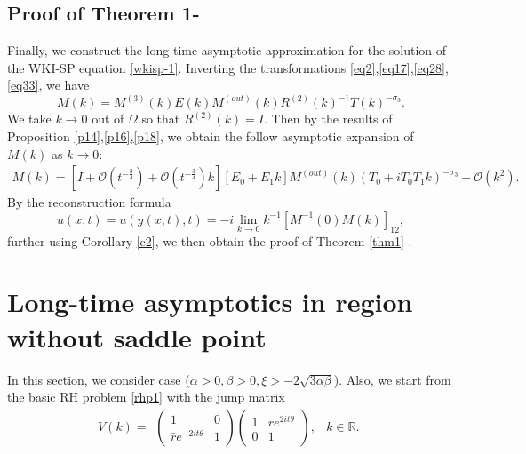 \documentclass[11pt]{article}
\numberwithin{equation}{section}
\begin{document}
\subsection{Proof of Theorem 1-\uppercase\expandafter{}}\label{subs3.5}
Finally, we construct the long-time asymptotic approximation for the solution   of the WKI-SP equation \eqref{wkisp-1}. Inverting the transformations \eqref{eq2},\eqref{eq17},\eqref{eq28},\eqref{eq33}, we have
\begin{equation}
    M(k)=M^{(3)}(k)E(k)M^{(out)}(k)R^{(2)}(k)^{-1}T(k)^{-\sigma_3}.
\end{equation}
We take $k\to 0$ out of $\Omega$ so that $R^{(2)}(k)=I$. Then by the results of Proposition \ref{p14},\ref{p16},\ref{p18}, we obtain the follow asymptotic expansion of ${M}(k)$ as $k\to0$:
\begin{align}
    M(k)=\left[I+\mathcal{O}(t^{-\frac{3}{4}})+\mathcal{O}(t^{-\frac{3}{4}})k\right]\left[E_0+E_1k\right]M^{(out)}(k)\left(T_0+iT_0T_1k\right)^{-\sigma_3}+\mathcal{O}(k^2).
\end{align}
By the reconstruction formula
\begin{equation*}
    u(x, t) = u(y(x, t), t) = -i \lim_{k \to 0} k^{-1} \left[M^{-1}(0) M(k)\right]_{12},
\end{equation*}
further using Corollary \ref{c2}, we then  obtain the proof of Theorem \ref{thm1}-\uppercase\expandafter{}.

\section{Long-time asymptotics in region without saddle point}\label{sec5}
In this section, we consider case \uppercase\expandafter{} ($\alpha>0,\beta>0,\xi>-2\sqrt{3\alpha\beta} $). Also, we start from the basic RH problem \ref{rhp1} with the jump matrix
\begin{equation*}
V(k)=\begin{array}{ll}
\left(\begin{array}{cc}1&0\\
\bar{r}e^{-2it\theta}&1\end{array}\right) \left(\begin{array}{cc}1&re^{2it\theta}\\ 0&1\end{array}\right),&k \in \mathbb{R}.
\end{array}
\end{equation*}
\end{document}
